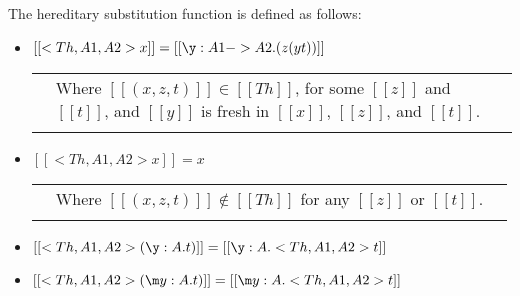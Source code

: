 \begin{definition}
  \label{def:hereditary_substitution_function}
  The hereditary substitution function is defined as follows:
  \small
  \begin{itemize}
  \item[] $[[<Th,A1,A2>x]] = [[\y:A1 -> A2.(z (y t))]]$\\
    \begin{tabular}{lll}
      & Where $[[(x,z,t)]] \in [[Th]]$, for some $[[z]]$ and $[[t]]$, and $[[y]]$ is fresh in $[[x]]$, $[[z]]$, and $[[t]]$.\\
      & \\
    \end{tabular}
  \item[] $[[<Th,A1,A2>x]] = x$\\
    \begin{tabular}{lll}
      & Where $[[(x,z,t)]] \not\in [[Th]]$ for any $[[z]]$ or $[[t]]$.\\
      & \\
    \end{tabular}
  \item[] $[[<Th,A1,A2>(\y:A.t)]] = [[\y:A.<Th, A1, A2>t]]$\\
  \item[] $[[<Th,A1,A2>(\m y:A.t)]] = [[\m y:A.<Th, A1, A2>t]]$\\


\end{itemize}
\end{definition}
